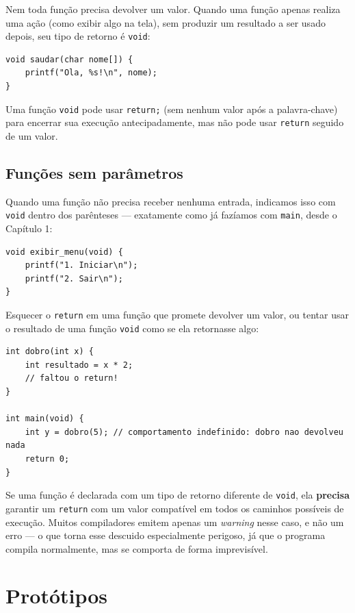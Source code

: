 Nem toda função precisa devolver um valor. Quando uma função apenas realiza uma ação (como exibir algo na tela), sem produzir um resultado a ser usado depois, seu tipo de retorno é \texttt{void}:

\begin{lstlisting}
void saudar(char nome[]) {
    printf("Ola, %s!\n", nome);
}
\end{lstlisting}

Uma função \texttt{void} pode usar \texttt{return;} (sem nenhum valor após a palavra-chave) para encerrar sua execução antecipadamente, mas não pode usar \texttt{return} seguido de um valor.

\subsection{Funções sem parâmetros}

Quando uma função não precisa receber nenhuma entrada, indicamos isso com \texttt{void} dentro dos parênteses — exatamente como já fazíamos com \texttt{main}, desde o Capítulo 1:

\begin{lstlisting}
void exibir_menu(void) {
    printf("1. Iniciar\n");
    printf("2. Sair\n");
}
\end{lstlisting}

\begin{errocomum}
Esquecer o \texttt{return} em uma função que promete devolver um valor, ou tentar usar o resultado de uma função \texttt{void} como se ela retornasse algo:
\begin{lstlisting}
int dobro(int x) {
    int resultado = x * 2;
    // faltou o return!
}

int main(void) {
    int y = dobro(5); // comportamento indefinido: dobro nao devolveu nada
    return 0;
}
\end{lstlisting}
Se uma função é declarada com um tipo de retorno diferente de \texttt{void}, ela \textbf{precisa} garantir um \texttt{return} com um valor compatível em todos os caminhos possíveis de execução. Muitos compiladores emitem apenas um \textit{warning} nesse caso, e não um erro — o que torna esse descuido especialmente perigoso, já que o programa compila normalmente, mas se comporta de forma imprevisível.
\end{errocomum}

\section{Protótipos}

